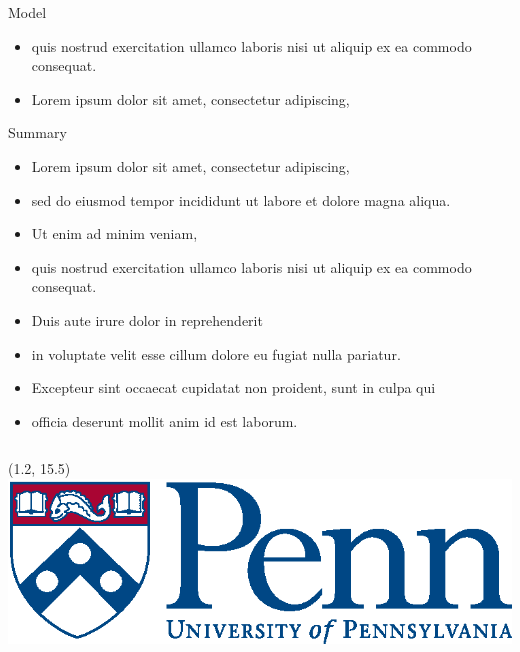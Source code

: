 \documentclass[12pt, final]{beamer}
\newlength{\onecolwid}
\begin{document}
\begin{frame}[t]
\begin{columns}[t]
\begin{column}{\onecolwid}
\begin{block}{Model}
\begin{itemize}
            \item quis nostrud exercitation ullamco laboris nisi ut aliquip ex ea commodo consequat.
            \item Lorem ipsum \alert{dolor} sit amet, consectetur adipiscing,
          \end{itemize}
        \end{block}
        \begin{block}{Summary}
          \begin{itemize}
            \item Lorem ipsum \alert{dolor} sit amet, consectetur adipiscing,
            \item sed do eiusmod tempor incididunt ut labore et dolore magna aliqua.
            \item Ut enim ad minim veniam,
            \item quis nostrud exercitation ullamco laboris nisi ut aliquip ex ea commodo consequat.
            \item Duis aute irure dolor in reprehenderit
            \item in voluptate velit \alert{esse cillum dolore} eu fugiat nulla pariatur.
            \item Excepteur sint occaecat cupidatat non proident, sunt in culpa qui
            \item officia deserunt mollit anim id est laborum.
          \end{itemize}
        \end{block}
      \end{column}

  \end{columns}

  \begin{textblock}{10}(1.2, 15.5)
   \includegraphics[scale=2]{penn}
  \end{textblock}

\end{frame}
\end{document}
